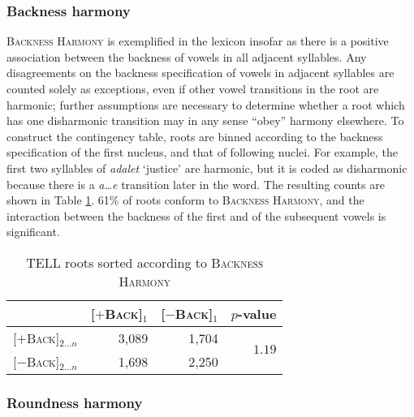 \subsubsection{Backness harmony}

\textsc{Backness Harmony} is exemplified in the lexicon insofar as there is a positive association between the backness of vowels in all adjacent syllables. Any disagreements on the backness specification of vowels in adjacent syllables are counted solely as exceptions, even if other vowel transitions in the root are harmonic; further assumptions are necessary to determine whether a root which has one disharmonic transition may in any sense ``obey'' harmony elsewhere.
To construct the contingency table, roots are binned according to the backness specification of the first nucleus, and that of following nuclei. For example, the first two syllables of \emph{adalet} `justice' are harmonic, but it is coded as disharmonic because there is a \emph{a\ldots{}e} transition later in the word. The resulting counts are shown in Table \ref{bhs}. 61\% of roots conform to \textsc{Backness Harmony}, and the interaction between the backness of the first and of the subsequent vowels
is significant.

\begin{table}[t]
\centering
\begin{tabular}{lrrr}
\toprule
                             & [$+$\textsc{Back}]$_1$ & [$-$\textsc{Back}]$_1$ & $p$-value                     \\
\midrule
\buf{}[$+$\textsc{Back}]$_{2\ldots{}n}$ & 3,089                     & 1,704              & \multirow{2}{*}{$1.19$\e{-89}} \\
\buf{}[$-$\textsc{Back}]$_{2\ldots{}n}$ & 1,698                     & 2,250                                               \\
\bottomrule
\end{tabular}
\caption{TELL roots sorted according to \textsc{Backness Harmony}}
\label{bhs}
\end{table}

\subsubsection{Roundness harmony}

